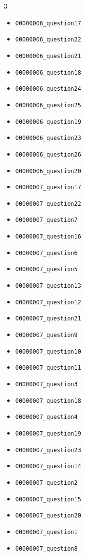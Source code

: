 \begin{multicols}{3}
\begin{itemize}[nosep, leftmargin=*]
        

        \item \texttt{00000006\_question17}
        \item \texttt{00000006\_question22}
        \item \texttt{00000006\_question21}
        \item \texttt{00000006\_question18}
        \item \texttt{00000006\_question24}
        \item \texttt{00000006\_question25}
        \item \texttt{00000006\_question19}
        \item \texttt{00000006\_question23}
        \item \texttt{00000006\_question26}
        \item \texttt{00000006\_question20}
        
        

        \item \texttt{00000007\_question17}
        \item \texttt{00000007\_question22}
        \item \texttt{00000007\_question7}
        \item \texttt{00000007\_question16}
        \item \texttt{00000007\_question6}
        \item \texttt{00000007\_question5}
        \item \texttt{00000007\_question13}
        \item \texttt{00000007\_question12}
        \item \texttt{00000007\_question21}
        \item \texttt{00000007\_question9}
        \item \texttt{00000007\_question10}
        \item \texttt{00000007\_question11}
        \item \texttt{00000007\_question3}
        \item \texttt{00000007\_question18}
        \item \texttt{00000007\_question4}
        \item \texttt{00000007\_question19}
        \item \texttt{00000007\_question23}
        \item \texttt{00000007\_question14}
        \item \texttt{00000007\_question2}
        \item \texttt{00000007\_question15}
        \item \texttt{00000007\_question20}
        \item \texttt{00000007\_question1}
        \item \texttt{00000007\_question8}
        

\end{itemize}
\end{multicols}
